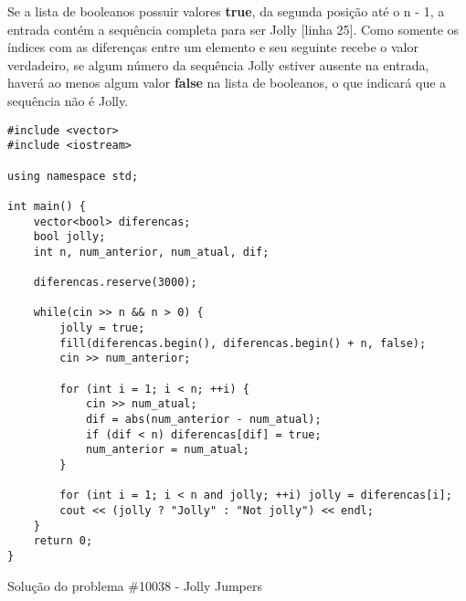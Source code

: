 \documentclass[a4paper,12pt]{scrartcl}
\begin{document}
Se a lista de booleanos possuir valores \textbf{true}, da segunda posição até o n - 1, a entrada contém a sequência completa para ser Jolly [linha 25]. Como somente os índices com as diferenças entre um elemento e seu seguinte recebe o valor verdadeiro, se algum número da sequência Jolly estiver ausente na entrada, haverá ao menos algum valor \textbf{false} na lista de booleanos, o que indicará que a sequência não é Jolly.

\begin{listing}[H]
\begin{verbatim}
#include <vector>
#include <iostream>

using namespace std;

int main() {
    vector<bool> diferencas;
    bool jolly;
    int n, num_anterior, num_atual, dif;

    diferencas.reserve(3000);

    while(cin >> n && n > 0) {
        jolly = true;
        fill(diferencas.begin(), diferencas.begin() + n, false);
        cin >> num_anterior;

        for (int i = 1; i < n; ++i) {
            cin >> num_atual;
            dif = abs(num_anterior - num_atual);
            if (dif < n) diferencas[dif] = true;
            num_anterior = num_atual;
        }

        for (int i = 1; i < n and jolly; ++i) jolly = diferencas[i];
        cout << (jolly ? "Jolly" : "Not jolly") << endl;
    }
    return 0;
}
\end{verbatim}
\caption{\footnotesize{Solução do problema \#10038 - Jolly Jumpers}}
\end{listing}
\end{document}
